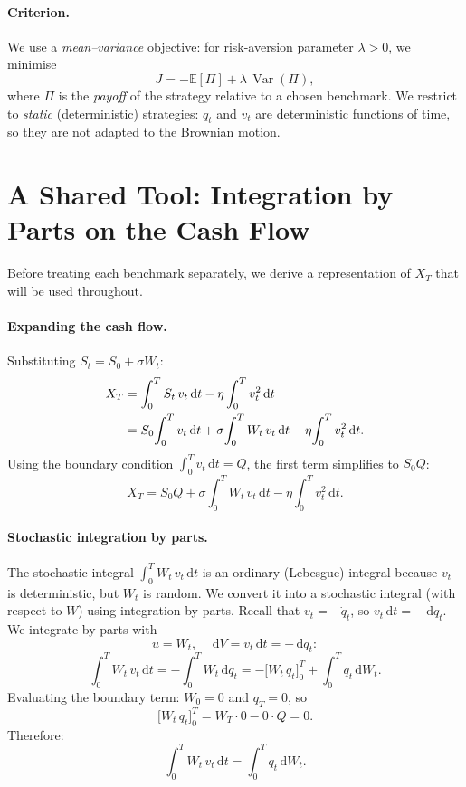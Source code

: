 \documentclass[12pt, a4paper]{article}
\newcommand{\E}{\mathbb{E}}
\newcommand{\Var}{\operatorname{Var}}
\newcommand{\dd}{\,\mathrm{d}}
\begin{document}
\paragraph{Criterion.}
We use a \emph{mean--variance} objective: for risk-aversion parameter $\lambda > 0$,
we minimise
\[
  J = -\E[\Pi] + \lambda\,\Var(\Pi),
\]
where $\Pi$ is the \emph{payoff} of the strategy relative to a chosen benchmark.
We restrict to \emph{static} (deterministic) strategies: $q_t$ and $v_t$ are
deterministic functions of time, so they are not adapted to the Brownian motion.

\section{A Shared Tool: Integration by Parts on the Cash Flow}
\label{sec:ibp}

Before treating each benchmark separately, we derive a representation of $X_T$
that will be used throughout.

\paragraph{Expanding the cash flow.}
Substituting $S_t = S_0 + \sigma W_t$:
\begin{align}
  X_T
  &= \int_0^T S_t\,v_t \dd t - \eta\int_0^T v_t^2 \dd t \notag\\
  &= S_0\!\int_0^T v_t \dd t
     + \sigma\!\int_0^T W_t\,v_t \dd t
     - \eta\!\int_0^T v_t^2 \dd t.
\end{align}
Using the boundary condition $\int_0^T v_t \dd t = Q$, the first term simplifies to $S_0 Q$:
\begin{equation}
  X_T = S_0 Q + \sigma\!\int_0^T W_t\,v_t \dd t - \eta\!\int_0^T v_t^2 \dd t.
  \label{eq:XT-raw}
\end{equation}

\paragraph{Stochastic integration by parts.}
The stochastic integral $\int_0^T W_t \,v_t \dd t$ is an ordinary (Lebesgue) integral
because $v_t$ is deterministic, but $W_t$ is random.
We convert it into a stochastic integral (with respect to $W$)
using integration by parts. Recall that $v_t = -\dot q_t$, so $v_t \dd t = -\dd q_t$.
We integrate by parts with
\[
  u = W_t, \quad \dd V = v_t \dd t = -\dd q_t:
\]
\[
  \int_0^T W_t\,v_t \dd t
  = -\int_0^T W_t \dd q_t
  = -\bigl[W_t\,q_t\bigr]_0^T + \int_0^T q_t \dd W_t.
\]
Evaluating the boundary term: $W_0 = 0$ and $q_T = 0$, so
\[
  \bigl[W_t\,q_t\bigr]_0^T = W_T\cdot 0 - 0\cdot Q = 0.
\]
Therefore:
\begin{equation}
  \boxed{\int_0^T W_t\,v_t \dd t = \int_0^T q_t \dd W_t.}
  \label{eq:ibp}
\end{equation}
\end{document}
